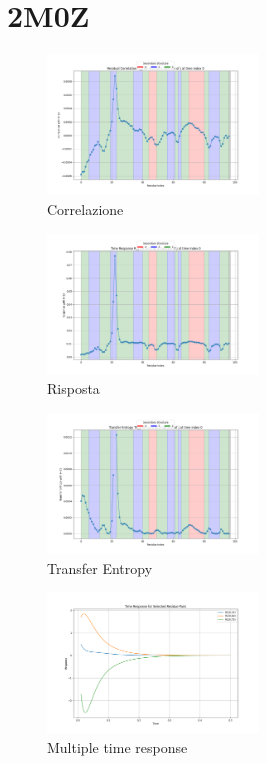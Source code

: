 \documentclass[Lau,binding=0.6cm,oneside,noexaminfo]{sapthesis}
\begin{document}
\section{2M0Z}
\begin{figure}[H]
    \centering
    \includegraphics[width=0.5\textwidth]{images/2m0zResidual Correlation C_ij for i=22 as a function of j at time index 0.png}
    \caption{Correlazione}
\end{figure}
\begin{figure}[H]
    \centering
    \includegraphics[width=0.5\textwidth]{"images/2m0zTime Response R_ij for i=22 as a function of j at time index 0.png"}
    \caption{Risposta}
\end{figure}

\begin{figure}[H]
    \centering
    \includegraphics[width=0.5\textwidth]{"images/2m0zTransfer Entropy TE_ij for i=22 as a function of j at time index 0.png"}
    \caption{Transfer Entropy}
\end{figure}
\begin{figure}[H]
    \centering
    \includegraphics[width=0.5\textwidth]{"images/2m0zMultiple_time_resposne.png"}
    \caption{Multiple time response}
\end{figure}
\end{document}
